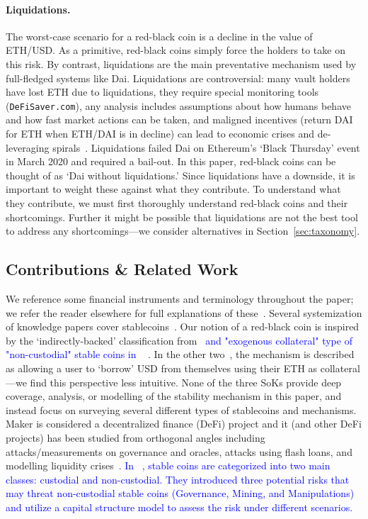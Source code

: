 \paragraph{Liquidations.} The worst-case scenario for a red-black coin is a decline in the value of ETH/USD. As a primitive, red-black coins simply force the holders to take on this risk. By contrast, liquidations are the main preventative mechanism used by full-fledged systems like Dai. Liquidations are controversial: many vault holders have lost ETH due to liquidations, they require special monitoring tools (\eg \texttt{DeFiSaver.com}), any analysis includes assumptions about how humans behave and how fast market actions can be taken, and maligned incentives (\eg return DAI for ETH when ETH/DAI is in decline) can lead to economic crises and de-leveraging spirals~\cite{GPH+20,KMM20}. Liquidations failed Dai on Ethereum's `Black Thursday' event in March 2020 and required a bail-out. In this paper, red-black coins can be thought of as `Dai without liquidations.' Since liquidations have a downside, it is important to weight these against what they contribute. To understand what they contribute, we must first thoroughly understand red-black coins and their shortcomings. Further it might be possible that liquidations are not the best tool to address any shortcomings---we consider alternatives in Section~\ref{sec:taxonomy}.


\subsection{Contributions \& Related Work} We reference some financial instruments and terminology throughout the paper; we refer the reader elsewhere for full explanations of these~\cite{Har03}. Several systemization of knowledge papers cover stablecoins~\cite{PHP+19,MSS20,CDM20}. Our notion of a red-black coin is inspired by the `indirectly-backed' classification from~\cite{CDM20} \textcolor{blue}{and "exogenous collateral" type of "non-custodial" stable coins in ~\cite{klages2020stablecoins}}
. In the other two~\cite{PHP+19,MSS20}, the mechanism is described as allowing a user to `borrow' USD from themselves using their ETH as collateral---we find this perspective less intuitive. None of the three SoKs provide deep coverage, analysis, or modelling of the stability mechanism in this paper, and instead focus on surveying several different types of stablecoins and mechanisms. Maker is considered a decentralized finance (DeFi) project and it (and other DeFi projects) has been studied from orthogonal angles including attacks/measurements on governance and oracles, attacks using flash loans, and modelling liquidity crises~\cite{GRB20,GPH+20,QZLG20,KMM20}. \textcolor{blue}{In ~\cite{klages2020stablecoins}, stable coins are categorized into two main classes: custodial and non-custodial. They introduced three potential risks that may threat non-custodial stable coins (Governance, Mining, and Manipulations) and utilize a capital structure model to assess the risk under different scenarios.}



